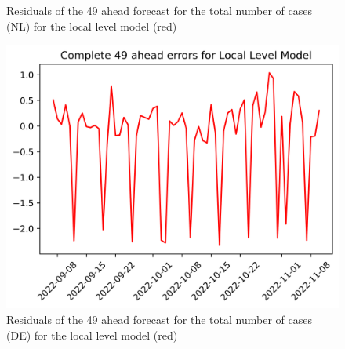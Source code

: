 \begin{figure}
\begin{minipage}{.32\textwidth}
  \caption{Residuals of the 49 ahead forecast for the total number of cases (NL) for the local level model (red)}
  \label{fig:tot_cases_error_49_LLM}
\end{minipage}
\begin{minipage}{.32\textwidth}
  \centering
  \includegraphics[width=\linewidth]{pics/49_ah/DE_49_ahead_errors_Local Level Model.png}
  \caption{Residuals of the 49 ahead forecast for the total number of cases (DE) for the local level model (red)}
  \label{fig:tot_cases_error_49_LLM_DE}
\end{minipage}

\end{figure}


